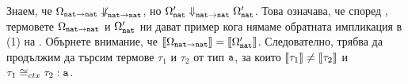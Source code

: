 Знаем, че $\Omega_{\texttt{nat}\to\texttt{nat}} \not\Downarrow^{}_{\texttt{nat}\to\texttt{nat}}$, но $\Omega'_{\texttt{nat}} \Downarrow^{}_{\texttt{nat}\to\texttt{nat}} \Omega'_{\texttt{nat}}$.
Това означава, че според , термовете $\Omega_{\texttt{nat}\to\texttt{nat}}$ и $\Omega'_{\texttt{nat}}$ ни дават пример кога нямаме обратната импликация в (1) на .
Обърнете внимание, че $\llbracket{\Omega_{\texttt{nat}\to\texttt{nat}}}\rrbracket = \llbracket{\Omega'_{\texttt{nat}}}\rrbracket$.
Следователно, трябва да продължим да търсим термове $\tau_1$ и $\tau_2$ от тип $\texttt{a}$, за които $\llbracket{\tau_1}\rrbracket \neq \llbracket{\tau_2}\rrbracket$
и $\tau_1 \cong_{ctx} \tau_2 : \texttt{a}$.


